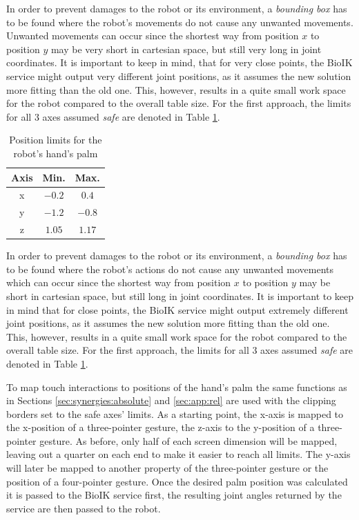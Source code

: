 In order to prevent damages to the robot or its environment, a \textit{bounding box} has to be found where the robot's movements do not cause any unwanted movements. Unwanted movements can occur since the shortest way from position $x$ to position $y$ may be very short in cartesian space, but still very long in joint coordinates. It is important to keep in mind, that for very close points, the BioIK service might output very different joint positions, as it assumes the new solution more fitting than the old one. This, however, results in a quite small work space for the robot compared to the overall table size. For the first approach, the limits for all 3 axes assumed \textit{safe} are denoted in Table \ref{tab:safeaxes}.

\begin{table}
	\caption{\label{tab:safeaxes}Position limits for the robot's hand's palm}
	\begin{tabular}{|c|c|c|}
		\hline
		\textbf{Axis} & \textbf{Min.} & \textbf{Max.} \\
		\hline
		x & $-0.2$ & $0.4$ \\
		\hline
		y & $-1.2$ & $-0.8$ \\
		\hline
		z & $1.05$ & $1.17$ \\
		\hline
	\end{tabular}
\end{table}

In order to prevent damages to the robot or its environment, a \textit{bounding box} has to be found where the robot's actions do not cause any unwanted movements which can occur since the shortest way from position $x$ to position $y$ may be short in cartesian space, but still long in joint coordinates. It is important to keep in mind that for close points, the BioIK service might output extremely different joint positions, as it assumes the new solution more fitting than the old one. This, however, results in a quite small work space for the robot compared to the overall table size. For the first approach, the limits for all 3 axes assumed \textit{safe} are denoted in Table \ref{tab:safeaxes}.

To map touch interactions to positions of the hand's palm the same functions as in Sections \ref{sec:synergies:absolute} and \ref{sec:app:rel} are used with the clipping borders set to the safe axes' limits. As a starting point, the x-axis is mapped to the x-position of a three-pointer gesture, the z-axis to the y-position of a three-pointer gesture. As before, only half of each screen dimension will be mapped, leaving out a quarter on each end to make it easier to reach all limits. The y-axis will later be mapped to another property of the three-pointer gesture or the position of a four-pointer gesture. Once the desired palm position was calculated it is passed to the BioIK service first, the resulting joint angles returned by the service are then passed to the robot.

